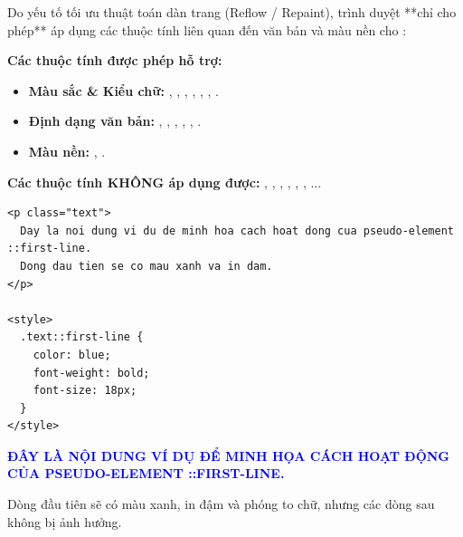 \begin{warnBox}
Do yếu tố tối ưu thuật toán dàn trang (Reflow / Repaint), trình duyệt **chỉ cho phép** áp dụng các thuộc tính liên quan đến văn bản và màu nền cho :
\par\vspace{4pt}
\textbf{Các thuộc tính được phép hỗ trợ:}
\begin{itemize}[leftmargin=1.5em, itemsep=2pt, parsep=0pt]
    \item \textbf{Màu sắc \& Kiểu chữ:} , , , , , , .
    \item \textbf{Định dạng văn bản:} , , , , , .
    \item \textbf{Màu nền:} , .
\end{itemize}
\par\vspace{4pt}
\textbf{Các thuộc tính KHÔNG áp dụng được:} , , , , , , ...
\end{warnBox}

\begin{codeWindow}
\begin{lstlisting}[language=HTML5]
<p class="text">
  Day la noi dung vi du de minh hoa cach hoat dong cua pseudo-element ::first-line.
  Dong dau tien se co mau xanh va in dam.
</p>

<style>
  .text::first-line {
    color: blue;
    font-weight: bold;
    font-size: 18px;
  }
</style>
\end{lstlisting}
\end{codeWindow}

\begin{browserWindow}
\sffamily\small
\textbf{\textcolor{blue}{\Large ĐÂY LÀ NỘI DUNG VÍ DỤ ĐỂ MINH HỌA CÁCH HOẠT ĐỘNG CỦA PSEUDO-ELEMENT ::FIRST-LINE.}} \par\vspace{2pt}
Dòng đầu tiên sẽ có màu xanh, in đậm và phóng to chữ, nhưng các dòng sau không bị ảnh hưởng.
\end{browserWindow}

